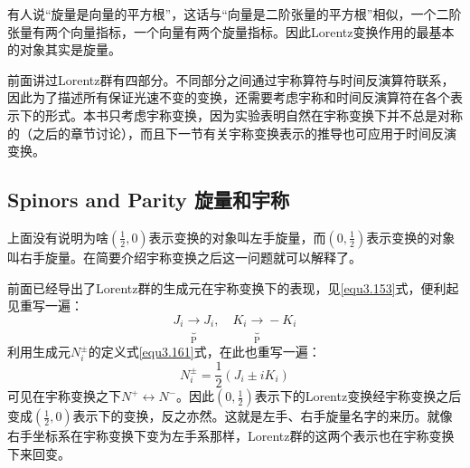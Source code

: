 有人说“旋量是向量的平方根”，这话与“向量是二阶张量的平方根”相似，一个二阶张量有两个向量指标，一个向量有两个旋量指标。因此Lorentz变换作用的最基本的对象其实是旋量。

前面讲过Lorentz群有四部分。不同部分之间通过宇称算符与时间反演算符联系，因此为了描述所有保证光速不变的变换，还需要考虑宇称和时间反演算符在各个表示下的形式。本书只考虑宇称变换，因为实验表明自然在宇称变换下并不总是对称的（之后的章节讨论），而且下一节有关宇称变换表示的推导也可应用于时间反演变换。

\subsection[旋量和宇称]{Spinors and Parity \quad 旋量和宇称}
\label{sec3.7.9}
上面没有说明为啥$(\frac{1}{2}, 0)$表示变换的对象叫左手旋量，而$(0, \frac{1}{2})$表示变换的对象叫右手旋量。在简要介绍宇称变换之后这一问题就可以解释了。

前面已经导出了Lorentz群的生成元在宇称变换下的表现，见\ref{equ3.153}式，便利起见重写一遍：
\begin{equation}
\label{equ3.222}
    J_i \underbrace{\rightarrow}_{\mathrm{P}} J_i, \quad K_i \underbrace{\rightarrow}_{\mathrm{P}} -K_i
\end{equation}
利用生成元$N_i^\pm$的定义式\ref{equ3.161}式，在此也重写一遍：
\begin{equation}
\label{equ3.223}
    N_i^\pm = \frac{1}{2} (J_i \pm iK_i)
\end{equation}
可见在宇称变换之下$N^+ \leftrightarrow N^-$。因此$(0, \frac{1}{2})$表示下的Lorentz变换经宇称变换之后变成$(\frac{1}{2}, 0)$表示下的变换，反之亦然。这就是左手、右手旋量名字的来历。就像右手坐标系在宇称变换下变为左手系那样，Lorentz群的这两个表示也在宇称变换下来回变。

